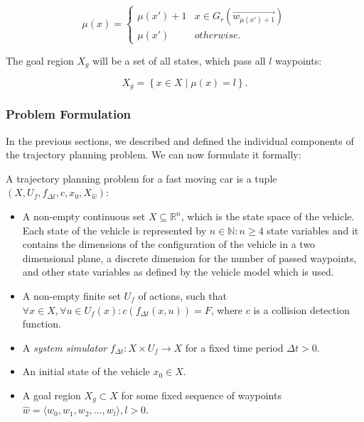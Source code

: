\begin{equation*}
	\mu(x)=
	\begin{cases}
		\mu(x')+1 & x\in G_r(\vec{w_{\mu(x')+1}}) \\
		\mu(x') & otherwise.
	\end{cases}
\end{equation*}

The goal region $X_g$ will be a set of all states, which pass all $l$ waypoints:

\[
	X_g=\left\{x\in X \mid \mu(x)=l\right\}.
\]

\subsubsection{Problem Formulation}

In the previous sections, we described and defined the individual components of the trajectory planning problem. We can now formulate it formally:

\begin{defn}

	A trajectory planning problem for a fast moving car is a tuple $\left(X, U_f, f_{\Delta t}, c, x_0, X_{\hat{w}}\right)$:

	\begin{itemize}
		\item A non-empty continuous set $X\subseteq\mathbb{R}^n$, which is the state space of the vehicle. Each state of the vehicle is represented by $n\in\mathbb{N}:n\geq4$ state variables and it contains the dimensions of the configuration of the vehicle in a two dimensional plane, a discrete dimension for the number of passed waypoints, and other state variables as defined by the vehicle model which is used.

		\item A non-empty finite set $U_f$ of actions, such that $\forall x\in X, \forall u\in U_f(x): c(f_{\Delta t}(x, u)) = F$, where $c$ is a collision detection function.

		\item A \textit{system simulator} $f_{\Delta t}:X\times U_f \rightarrow X$ for a fixed time period $\Delta t>0$.
		
		\item An initial state of the vehicle $x_0 \in X$.

		\item A goal region $X_g\subset X$ for some fixed sequence of waypoints \\ $\hat{w}=\langle w_0, w_1, w_2,\ldots, w_l \rangle, l>0$.
	\end{itemize}
\end{defn}

